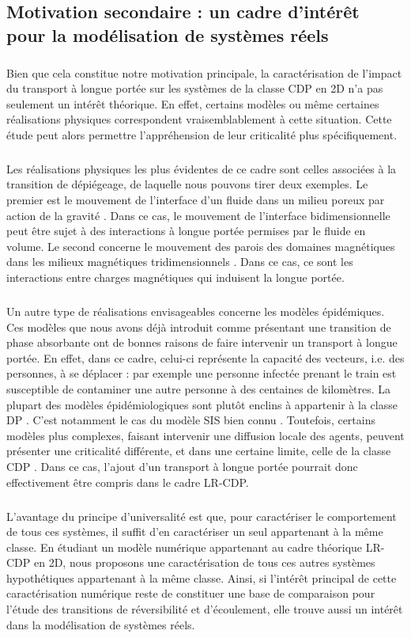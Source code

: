 \subsection{Motivation secondaire : un cadre d'intérêt pour la modélisation de systèmes réels}

\subparagraph{}Bien que cela constitue notre motivation principale, la caractérisation de l'impact du transport à longue portée sur les systèmes de la classe CDP en 2D n'a pas seulement un intérêt théorique. En effet, certains modèles ou même certaines réalisations physiques correspondent vraisemblablement à cette situation. Cette étude peut alors permettre l'appréhension de leur criticalité plus spécifiquement.

\subparagraph{}Les réalisations physiques les plus évidentes de ce cadre sont celles associées à la transition de dépiégeage, de laquelle nous pouvons tirer deux exemples. Le premier est le mouvement de l'interface d'un fluide dans un milieu poreux par action de la gravité \cite{zhao_interface_2013}. Dans ce cas, le mouvement de l'interface bidimensionnelle peut être sujet à des interactions à longue portée permises par le fluide en volume. Le second concerne le mouvement des parois des domaines magnétiques dans les milieux magnétiques tridimensionnels \cite{alava_disorder_induced_1996}. Dans ce cas, ce sont les interactions entre charges magnétiques qui induisent la longue portée\cite{le_priol_long_range_2020}.

\subparagraph{}Un autre type de réalisations envisageables concerne les modèles épidémiques. Ces modèles que nous avons déjà introduit comme présentant une transition de phase absorbante ont de bonnes raisons de faire intervenir un transport à longue portée. En effet, dans ce cadre, celui-ci représente la capacité des vecteurs, i.e. des personnes, à se déplacer : par exemple une personne infectée prenant le train est susceptible de contaminer une autre personne à des centaines de kilomètres. La plupart des modèles épidémiologiques sont plutôt enclins à appartenir à la classe DP \cite{sanhedrai_epidemics_2022}. C'est notamment le cas du modèle SIS bien connu \cite{mota_critical_2018}. Toutefois, certains modèles plus complexes, faisant intervenir une diffusion locale des agents, peuvent présenter une criticalité différente, et dans une certaine limite, celle de la classe CDP \cite{nettuno_role_2024}. Dans ce cas, l'ajout d'un transport à longue portée pourrait donc effectivement être compris dans le cadre LR-CDP.

\subparagraph{}L'avantage du principe d'universalité est que, pour caractériser le comportement de tous ces systèmes, il suffit d'en caractériser un seul appartenant à la même classe. En étudiant un modèle numérique appartenant au cadre théorique LR-CDP en 2D, nous proposons une caractérisation de tous ces autres systèmes hypothétiques appartenant à la même classe. Ainsi, si l'intérêt principal de cette caractérisation numérique reste de constituer une base de comparaison pour l'étude des transitions de réversibilité et d'écoulement, elle trouve aussi un intérêt dans la modélisation de systèmes réels.

